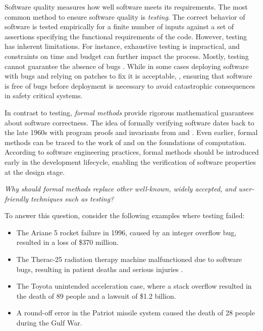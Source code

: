 Software quality measures how well software meets its requirements.
The most common method to ensure software quality is \emph{testing}.
The correct behavior of software is tested empirically for a finite number of inputs against a set of assertions specifying the functional requirements of the code.
However, testing has inherent limitations. For instance,
exhaustive testing is impractical, and constraints on time and budget can further impact the process.
Mostly, testing cannot guarantee the absence of bugs .
While in some cases deploying software with bugs and relying on patches to fix it is acceptable, \cf{} , ensuring that software is free of bugs before deployment is necessary to avoid catastrophic consequences in safety critical systems.

In contrast to testing, \emph{formal methods} provide rigorous mathematical guarantees about software correctness.
The idea of formally verifying software dates back to the late 1960s with program proofs and invariants from  and .
Even earlier, formal methods can be traced to the work of  and  on the foundations of computation.
According to software engineering practices, formal methods should be introduced early in the development lifecycle, enabling the verification of software properties at the design stage.

\begin{center}\em
  Why should formal methods replace other well-known, widely accepted, and user-friendly techniques such as testing?
\end{center}

To answer this question, consider the following examples where testing failed:

\begin{itemize}
\item The Ariane 5 rocket failure in 1996, caused by an integer overflow bug, resulted in a loss of \$370 million.
\item The Therac-25 radiation therapy machine malfunctioned due to software bugs, resulting in patient deaths and serious injuries .
\item The Toyota unintended acceleration case, where a stack overflow resulted in the death of 89 people and a lawsuit of \$1.2 billion.
\item A round-off error in the Patriot missile system caused the death of 28 people during the Gulf War.
\end{itemize}

